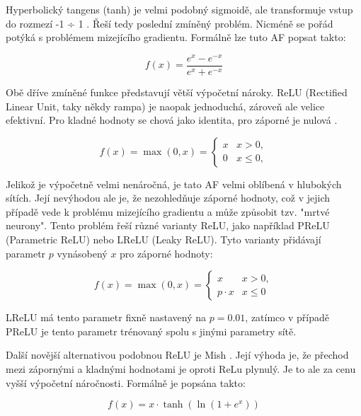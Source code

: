 Hyperbolický tangens (tanh) je velmi podobný sigmoidě, ale transformuje vstup
do rozmezí -1 ÷ 1  \cite{afreview}. Řeší tedy poslední zmíněný problém. Nicméně se pořád potýká
s problémem mizejícího gradientu. Formálně lze tuto AF popsat takto:

\begin{equation*}
    f(x)= \frac{e^x-e^{-x}}{e^x+e^{-x}}
\end{equation*}

 Obě dříve zmíněné funkce představují větší
výpočetní nároky. ReLU (Rectified Linear Unit, taky někdy rampa) je naopak jednoduchá, zároveň ale velice efektivní.
Pro kladné hodnoty se chová jako identita, pro záporné je nulová  \cite{reluAnalysis}.

\begin{equation*}
    f(x)=\max(0,x)=\begin{cases}x&x>0,\\0&x\leq0,\end{cases}
\end{equation*}

Jelikož je výpočetně velmi nenáročná, je tato AF velmi oblíbená v hlubokých
sítích. Její nevýhodou ale je, že nezohledňuje záporné hodnoty, což v jejich
případě vede k problému mizejícího gradientu a může způsobit tzv. "mrtvé
neurony". Tento problém řeší různé varianty ReLU, jako například PReLU
(Parametric ReLU) nebo LReLU (Leaky ReLU). Tyto varianty přidávají parametr $p$
vynásobený $x$ pro záporné hodnoty:

\begin{equation*}
    f(x)=\max(0,x)=\begin{cases}x&x>0,\\p \cdot x&x\leq0\end{cases}
\end{equation*}

LReLU má tento parametr fixně nastavený na $p=0.01$, zatímco v případě PReLU je
tento parametr trénovaný spolu s jinými parametry sítě.

Další novější alternativou podobnou ReLU je Mish \cite{mishaf}. Její výhoda je, že přechod mezi zápornými a kladnými hodnotami je oproti ReLu plynulý. Je to ale za cenu vyšší výpočetní náročnosti. Formálně je popsána takto:

\begin{equation*}
    f(x) = x \cdot \tanh\left( \ln\left(1 + e^{x}\right) \right)
\end{equation*}


